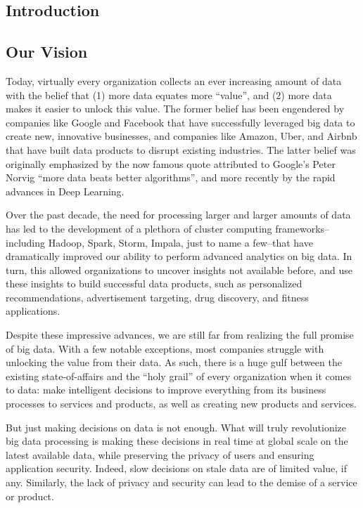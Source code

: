\documentclass [10pt]{article}
\begin{document}
\setcounter{section}{0}


\newpage
\pagestyle{plain}
\setcounter{page}{1}

\begin{outline}
\section{Introduction}

\subsection{Our Vision}

Today, virtually every organization collects an ever increasing amount of data with the belief that (1) more data equates more ``value'', and (2) more data makes it easier to unlock this value. The former belief has been engendered by companies like Google and Facebook that have successfully leveraged big data to create new, innovative businesses, and companies like Amazon, Uber, and Airbnb that have built data products to disrupt existing industries. The latter belief was originally emphasized by the now famous quote attributed to Google's Peter Norvig ``more data beats better algorithms'', and more recently by the rapid advances in Deep Learning. 

Over the past decade, the need for processing larger and larger amounts of data has led to the development of a plethora of cluster computing frameworks--including Hadoop, Spark, Storm, Impala, just to name a few--that have dramatically improved our ability to perform advanced analytics on big data. In turn, this allowed organizations to uncover insights not available before, and use these insights to build successful data products, such as personalized recommendations, advertisement targeting, drug discovery, and fitness applications.

Despite these impressive advances, we are still far from realizing the full promise of big data. With a few notable exceptions, most companies struggle with unlocking the value from their data. As such, there is a huge gulf between the existing state-of-affairs and the ``holy grail'' of every organization when it comes to data: make intelligent decisions to improve everything from its business processes to services and products, as well as creating new products and services. 

But just making decisions on data is not enough. What will truly revolutionize big data processing is making these decisions in real time at global scale on the latest available data, while preserving the privacy of users and ensuring application security. Indeed, slow decisions on stale data are of limited value, if any. Similarly, the lack of privacy and security can lead to the demise of a service or product.


\end{outline}
\end{document}
